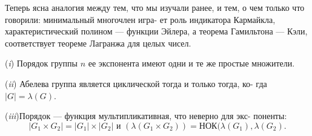 \begin{mynotice}
Теперь ясна аналогия между тем, что мы изучали ранее, и\linebreak
тем, о чем только что говорили: минимальный многочлен игра­-\linebreak
ет роль индикатора Кармайкла, характеристический полином —\linebreak
функции Эйлера, а теорема Гамильтона — Кэли, соответствует\linebreak
теореме Лагранжа для целых чисел.
\end{mynotice}

\begin{property}
\par \quad\;  (\textit{i}) Порядок группы $n$ ее экспонента имеют одни и те же простые\linebreak
множители.
\par  (\textit{ii}) Абелева группа является циклической тогда и только тогда, ко­-\linebreak
гда $|G| = \lambda(G)$.
\par  (\textit{iii})Порядок — функция мультипликативная, что неверно для экс­-\linebreak
поненты:
$$|G_1\times G_2| = |G_1|\times |G_2| \text{ и } (\lambda(G_1\times G_2)) = \text{НОК}(\lambda(G_1), \lambda(G_2).$$

\end{property}


